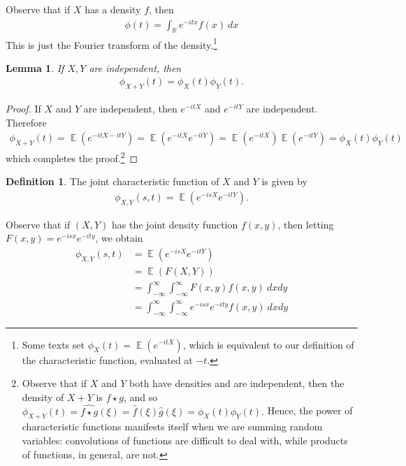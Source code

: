 \documentclass[12pt]{amsbook}
\newcommand{\rr}{\mathbb{R}}
\newcommand{\wh}{\widehat}
\DeclareMathOperator{\ex}{\mathbb{E}}
\theoremstyle{plain}
\newtheorem{lemma}[theorem]{Lemma}
\theoremstyle{definition}
\newtheorem*{definition}{Definition}
\theoremstyle{remark}
\numberwithin{equation}{section}  %
\begin{document}
	Observe that if $X$ has a density $f$, then
	\begin{equation*}
		\begin{split}
			\phi(t) = \int_{\rr} e^{-itx} f(x) \ dx
		\end{split}
	\end{equation*}
	This is just the Fourier transform of the density.\footnote{ 
		Some texts set $\phi_{X}(t) = \ex(e^{-itX})$,
		which is equivalent to our definition
	of the characteristic function, evaluated at $-t$.} 
	\begin{lemma}\label{lem:indep}
		If $X, Y$ are independent, then
		\begin{equation*}
			\begin{split}
				\phi_{X + Y}(t) = \phi_{X}(t) \phi_{Y}(t).
			\end{split}
		\end{equation*}
	\end{lemma}
	\begin{proof}
		If $X$ and $Y$ are independent, then $e^{-itX}$ and $e^{-itY}$ are independent.
		Therefore
		\begin{equation*}
			\begin{split}
				\phi_{X + Y}(t) = \ex(e^{-itX - itY}) = \ex(e^{-itX} e^{-itY})
				= \ex(e^{-itX}) \ex (e^{-itY}) = \phi_{X}(t) \phi_{Y}(t)
			\end{split}
		\end{equation*}
		which completes the proof.\footnote{
			Observe that if $X$ and $Y$ both have densities and are independent, then 
			the density of $X + Y$ is $f \star g$, and so 
			$\phi_{X + Y}(t) = \wh{f \star g}(\xi) = \wh{f}(\xi) \wh{g}(\xi) =
			\phi_{X}(t) \phi_{Y}(t).$ Hence, the power of characteristic functions
			manifests itself when we are summing random variables: convolutions of
			functions are difficult to deal with, while products of functions, in general,
		are not.}
	\end{proof}
	\begin{definition}
		The joint characteristic function of $X$ and $Y$ is given by
		\begin{equation*}
			\begin{split}
				\phi_{X,Y}(s,t) = \ex(e^{-isX} e^{-itY}).
			\end{split}
		\end{equation*}
	\end{definition}
	Observe that if $(X, Y)$ has the joint density function $f(x, y)$, then
	letting $F(x, y) = e^{-isx} e^{-ity}$, we obtain
	\begin{equation*}
		\begin{split}
			\phi_{X,Y}(s,t) & = \ex(e^{-isX} e^{-itY})
			\\
			& = \ex(F(X, Y))
			\\
			& = \int_{-\infty}^{\infty}\int_{-\infty}^{\infty} F(x, y) f(x, y) \ dx  dy
			\\
			& = \int_{-\infty}^{\infty}\int_{-\infty}^{\infty} e^{-isx} e^{-ity}
			f(x, y) \ dx  dy
		\end{split}
	\end{equation*}
\end{document}
